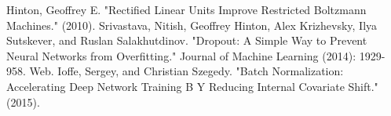 \documentclass[twoside,11pt]{article}
\theoremstyle{definition}
\begin{document}
\begin{thebibliography}{1}
    Hinton, Geoffrey E. "Rectified Linear Units Improve Restricted Boltzmann Machines." (2010). 
    Srivastava, Nitish, Geoffrey Hinton, Alex Krizhevsky, Ilya Sutskever, and Ruslan Salakhutdinov. "Dropout: A Simple Way to Prevent Neural Networks from Overfitting." Journal of Machine Learning (2014): 1929-958. Web. 
    Ioffe, Sergey, and Christian Szegedy. "Batch Normalization: Accelerating Deep Network Training B Y Reducing Internal Covariate Shift." (2015).
\end{thebibliography}
\end{document}
